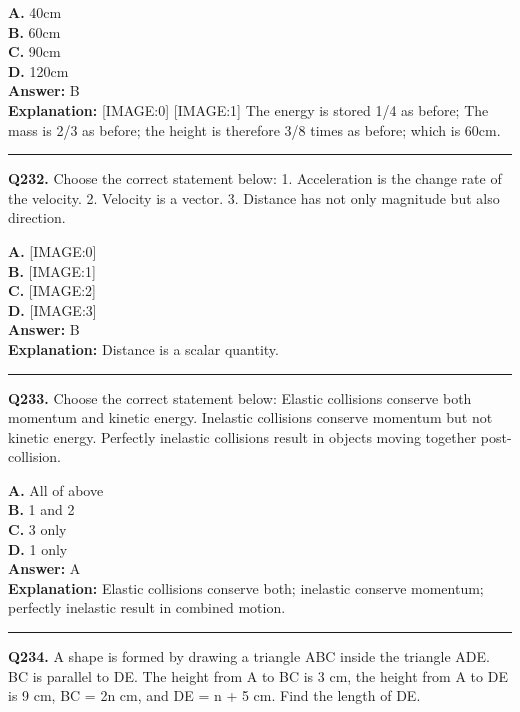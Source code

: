 \documentclass[12pt]{article}
\begin{document}
\textbf{A.} 40cm \\
\textbf{B.} 60cm \\
\textbf{C.} 90cm \\
\textbf{D.} 120cm \\

\textbf{Answer:} B \\
\textbf{Explanation:} [IMAGE:0]
[IMAGE:1]
The energy is stored 1/4 as before; The mass is 2/3 as before; the height is therefore 3/8 times as before; which is 60cm.

\hrule
\vspace{1em}


\noindent
\textbf{Q232.} Choose the correct statement below:
1. Acceleration is the change rate of the velocity.
2. Velocity is a vector.
3. Distance has not only magnitude but also direction.



\textbf{A.} [IMAGE:0] \\
\textbf{B.} [IMAGE:1] \\
\textbf{C.} [IMAGE:2] \\
\textbf{D.} [IMAGE:3] \\

\textbf{Answer:} B \\
\textbf{Explanation:} Distance is a scalar quantity.

\hrule
\vspace{1em}


\noindent
\textbf{Q233.} Choose the correct statement below:
Elastic collisions conserve both momentum and kinetic energy.
Inelastic collisions conserve momentum but not kinetic energy.
Perfectly inelastic collisions result in objects moving together post-collision.



\textbf{A.} All of above \\
\textbf{B.} 1 and 2 \\
\textbf{C.} 3 only \\
\textbf{D.} 1 only \\

\textbf{Answer:} A \\
\textbf{Explanation:} Elastic collisions conserve both; inelastic conserve momentum; perfectly inelastic result in combined motion.

\hrule
\vspace{1em}


\noindent
\textbf{Q234.} A shape is formed by drawing a triangle ABC inside the triangle ADE. BC is parallel to DE. The height from A to BC is 3 cm, the height from A to DE is 9 cm, BC = 2n cm, and DE = n + 5 cm.
Find the length of DE.
\end{document}
